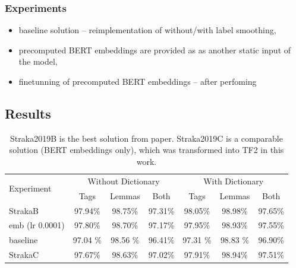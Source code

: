 \subsubsection{Experiments}
\begin{itemize}
\item baseline solution -- reimplementation of \citep{Straka2019czech} without/with label smoothing,
\item precomputed BERT embeddings are provided as as another static input of the model, 
\item finetunning of precomputed BERT embeddings -- after perfoming
\end{itemize}





\subsection{Results}

\begin{table}[!h]
  \begin{tabular}{|l||c|c|c||c|c|c|}
  \hline
\multirow{2}{*}{Experiment} & \multicolumn{3}{c||}{Without Dictionary}  &
      \multicolumn{3}{c|}{With Dictionary} \\ 
    & Tags & Lemmas & Both & Tags & Lemmas & Both \\ \hline
    StrakaB & 97.94\% & 98.75\% & 97.31\% & 98.05\% & 98.98\% & 97.65\% \\ \hline
    emb (lr 0.0001) &  97.80\% & 98.70\% & 97.17\% & 97.95\% & 98.93\% & 97.55\% \\ \hline
    baseline & 97.04 \% & 98.56 \% & 96.41\% &  97.31  \% & 98.83 \% & 96.90\% \\ \hline 
    StrakaC & 97.67\% & 98.63\% & 97.02\% & 97.91\% & 98.94\% & 97.51\% \\ \hline
  \end{tabular}
  \caption{%
  Straka2019B is the best solution from \citep{Straka2019} paper. Straka2019C is a comparable solution  (BERT embeddings only), which was transformed into TF2 in this work.} 
\end{table}


